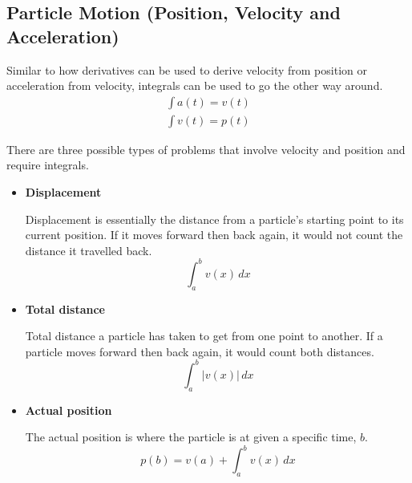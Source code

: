 \documentclass[12pt]{article}
\begin{document}
\subsection{Particle Motion (Position, Velocity and Acceleration)}
Similar to how derivatives can be used to derive velocity from position or acceleration from velocity, integrals can be used to go the other way around.
\begin{gather*}
    \int a(t) = v(t) \\
    \int v(t) = p(t)
\end{gather*}

There are three possible types of problems that involve velocity and position and require integrals.
\begin{itemize}
    \item \textbf{Displacement}

          Displacement is essentially the distance from a particle's starting point to its current position. If it moves forward then back again, it would not count the distance it travelled back.
          \[ \int_{a}^{b} v(x) \, dx \]

    \item \textbf{Total distance}

          Total distance a particle has taken to get from one point to another. If a particle moves forward then back again, it would count both distances.
          \[ \int_{a}^{b} |v(x)| \, dx \]

    \item \textbf{Actual position}

          The actual position is where the particle is at given a specific time, $b$.
          \[ p(b) = v(a) + \int_{a}^{b} v(x) \, dx \]
\end{itemize}
\end{document}
